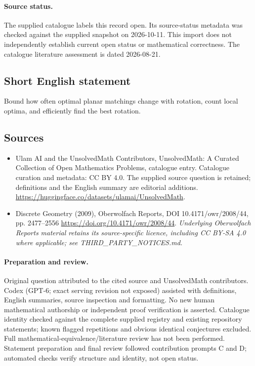\documentclass[11pt]{article}
\begin{document}
\paragraph{Source status.}
The supplied catalogue labels this record open. Its source-status metadata was checked against the supplied snapshot on 2026-10-11. This import does not independently establish current open status or mathematical correctness. The catalogue literature assessment is dated 2026-08-21.
\subsection{Short English statement}
Bound how often optimal planar matchings change with rotation, count local optima, and efficiently find the best rotation.
\subsection{Sources}
\begin{itemize}
\item[\hypertarget{source:statement:1}{S1}] Ulam AI and the UnsolvedMath Contributors, UnsolvedMath: A Curated Collection of Open Mathematics Problems, catalogue entry. Catalogue curation and metadata: CC BY 4.0. The supplied source question is retained; definitions and the English summary are editorial additions.
\url{https://huggingface.co/datasets/ulamai/UnsolvedMath}.
\item[\hypertarget{source:statement:2}{S2}] Discrete Geometry (2009), Oberwolfach Reports, DOI 10.4171/owr/2008/44, pp. 2477--2556
\url{https://doi.org/10.4171/owr/2008/44}.
\textit{Underlying Oberwolfach Reports material retains its source-specific licence, including CC BY-SA 4.0 where applicable; see THIRD\_PARTY\_NOTICES.md.}
\end{itemize}
\paragraph{Preparation and review.}
Original question attributed to the cited source and UnsolvedMath contributors. Codex (GPT-6; exact serving revision not exposed) assisted with definitions, English summaries, source inspection and formatting. No new human mathematical authorship or independent proof verification is asserted. Catalogue identity checked against the complete supplied registry and existing repository statements; known flagged repetitions and obvious identical conjectures excluded. Full mathematical-equivalence/literature review has not been performed. Statement preparation and final review followed contribution prompts C and D; automated checks verify structure and identity, not open status.
\label{end:statement}
\end{document}
